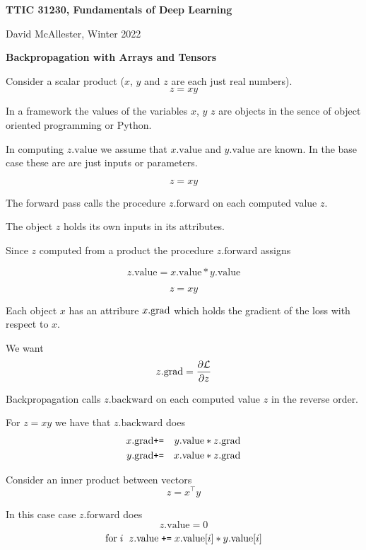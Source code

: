 




{\Huge
  
  \centerline{\bf TTIC 31230, Fundamentals of Deep Learning}
  \bigskip
  \centerline{David McAllester, Winter 2022}
  \vfill
  \vfill
  \centerline{\bf Backpropagation with Arrays and Tensors}
  \vfill
  \vfill


Consider a scalar product ($x$, $y$ and $z$ are each just real numbers).
$$z = xy$$

\vfill
In a framework the values of the variables $x$, $y$ $z$ are objects in the sence of object oriented programming or Python.

\vfill
In computing $z.\mathrm{value}$ we assume that $x.\mathrm{value}$ and $y.\mathrm{value}$ are known. In the base case these are are just inputs or parameters.

$$z = xy$$

\vfill
The forward pass calls the procedure $z.\mathrm{forward}$ on each computed value $z$.

\vfill
The object $z$ holds its own inputs in its attributes.

\vfill
Since $z$ computed from a product the procedure $z.\mathrm{forward}$ assigns

\vfill
$$z.\mathrm{value} = x.\mathrm{value}*y.\mathrm{value}$$

$$z = xy$$

\vfill
Each object $x$ has an attribure $x.\mathrm{grad}$ which holds the gradient of the loss with respect to $x$.

We want
$$z.\mathrm{grad} = \frac{\partial {\cal L}}{\partial z}$$

\vfill
Backpropagation calls $z.\mathrm{backward}$ on each computed value $z$ in the reverse order.

\vfill
For $z = xy$ we have that $z.\mathrm{backward}$ does
\begin{eqnarray*}
x.\mathrm{grad} & \mbox{\tt +=} & y.\mathrm{value}*z.\mathrm{grad} \\
y.\mathrm{grad} & \mbox{\tt +=} & x.\mathrm{value}* z.\mathrm{grad}
\end{eqnarray*}

Consider an inner product between vectors
$$z = x^\top y$$

\vfill
In this case case $z.\mathrm{forward}$ does
$$z.\mathrm{value} = 0$$
$$\mathrm{for}\;i\;\;z.\mathrm{value} \;\mbox{\tt +=}\;x.\mathrm{value}[i]*y.\mathrm{value}[i]$$

}
